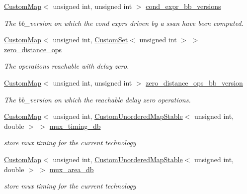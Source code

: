 \begin{DoxyCompactItemize}
\hyperlink{custom__map_8hpp_a18ca01763abbe3e5623223bfe5aaac6b}{Custom\+Map}$<$ unsigned int, unsigned int $>$ \hyperlink{classAllocationInformation_a22086c8754a4d007ca661f3946244198}{cond\+\_\+expr\+\_\+bb\+\_\+versions}
\begin{DoxyCompactList}\small\item\em The bb\+\_\+version on which the cond exprs driven by a ssan have been computed. \end{DoxyCompactList}\item 
\hyperlink{custom__map_8hpp_a18ca01763abbe3e5623223bfe5aaac6b}{Custom\+Map}$<$ unsigned int, \hyperlink{custom__set_8hpp_a615bc2f42fc38a4bb1790d12c759e86f}{Custom\+Set}$<$ unsigned int $>$ $>$ \hyperlink{classAllocationInformation_a84fb709cf7df7a3c902d86c97569009a}{zero\+\_\+distance\+\_\+ops}
\begin{DoxyCompactList}\small\item\em The operations reachable with delay zero. \end{DoxyCompactList}\item 
\hyperlink{custom__map_8hpp_a18ca01763abbe3e5623223bfe5aaac6b}{Custom\+Map}$<$ unsigned int, unsigned int $>$ \hyperlink{classAllocationInformation_a60156c362a1188cda46215299774b3f7}{zero\+\_\+distance\+\_\+ops\+\_\+bb\+\_\+version}
\begin{DoxyCompactList}\small\item\em The bb\+\_\+version on which the reachable delay zero operations. \end{DoxyCompactList}\item 
\hyperlink{custom__map_8hpp_a18ca01763abbe3e5623223bfe5aaac6b}{Custom\+Map}$<$ unsigned int, \hyperlink{custom__map_8hpp_a7314a7df1cdb3a3acf478ab86e95c226}{Custom\+Unordered\+Map\+Stable}$<$ unsigned int, double $>$ $>$ \hyperlink{classAllocationInformation_aceaa6d5e7adf99a1aa820c8626324657}{mux\+\_\+timing\+\_\+db}
\begin{DoxyCompactList}\small\item\em store mux timing for the current technology \end{DoxyCompactList}\item 
\hyperlink{custom__map_8hpp_a18ca01763abbe3e5623223bfe5aaac6b}{Custom\+Map}$<$ unsigned int, \hyperlink{custom__map_8hpp_a7314a7df1cdb3a3acf478ab86e95c226}{Custom\+Unordered\+Map\+Stable}$<$ unsigned int, double $>$ $>$ \hyperlink{classAllocationInformation_af7481fa4db3f76fe304c7d068f8436ed}{mux\+\_\+area\+\_\+db}
\begin{DoxyCompactList}\small\item\em store mux timing for the current technology \end{DoxyCompactList}\item 

\end{DoxyCompactItemize}
